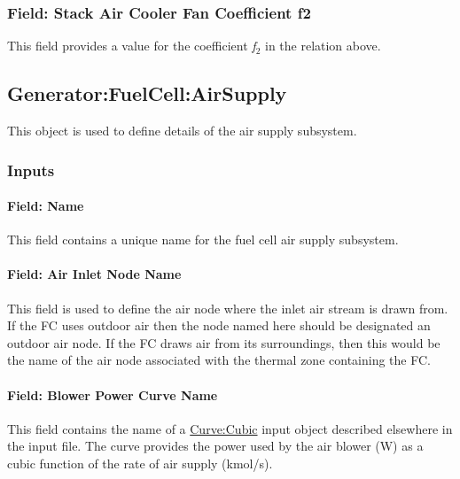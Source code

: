 \subsubsection{Field: Stack Air Cooler Fan Coefficient f2}\label{field-stack-air-cooler-fan-coefficient-f2}

This field provides a value for the coefficient \emph{f\(_{2}\)} in the relation above.

\subsection{Generator:FuelCell:AirSupply}\label{generatorfuelcellairsupply}

This object is used to define details of the air supply subsystem.

\subsubsection{Inputs}\label{inputs-14-003}

\paragraph{Field: Name}\label{field-name-16-001}

This field contains a unique name for the fuel cell air supply subsystem.

\paragraph{Field: Air Inlet Node Name}\label{field-air-inlet-node-name-1-000}

This field is used to define the air node where the inlet air stream is drawn from. If the FC uses outdoor air then the node named here should be designated an outdoor air node. If the FC draws air from its surroundings, then this would be the name of the air node associated with the thermal zone containing the FC.

\paragraph{Field: Blower Power Curve Name}\label{field-blower-power-curve-name}

This field contains the name of a \hyperref[curvecubic]{Curve:Cubic} input object described elsewhere in the input file. The curve provides the power used by the air blower (W) as a cubic function of the rate of air supply (kmol/s).

